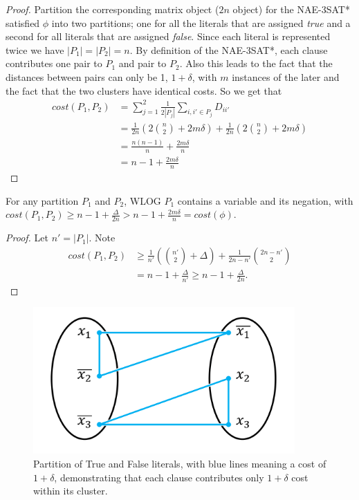 \begin{proof}
Partition the corresponding matrix object ($2n$ object) for the
NAE-3SAT* satisfied $\phi$ into two partitions; one for all the
literals that are assigned \textit{true} and a second for all literals
that are assigned \textit{false}.  Since each literal is represented
twice we have $|P_1| = |P_2| = n$.   By definition of the NAE-3SAT*,
each clause contributes one pair to $P_1$ and pair to $P_2$.   Also
this leads to the fact that the distances between pairs can only be 1,
$1+\delta$, with $m$ instances of the later and the fact that the two
clusters have identical costs. So we get that 
\begin{align*}
cost(P_1,P_2) &= \sum_{j=1}^{2} \frac{1}{2|P_j|} \sum_{i,i' \in P_j}
D_{ii'}\\ 
&= \frac{1}{2n}( 2 {n \choose 2} + 2m\delta ) + \frac{1}{2n}( 2 {n
  \choose 2} + 2m\delta ) \\ 
&= \frac{ n (n-1) } {n} + \frac{2 m \delta}{n} \\
&= n - 1 +  \frac{2 m \delta}{n}
\end{align*}
\end{proof}

\begin{lemma} \label{different-partitions}
For any partition $P_1$ and $P_2$, WLOG $P_1$ contains a variable and
its negation, with $cost(P_1,P_2) \ge n - 1 + \frac{\Delta}{2n} > n -
1 + \frac{2m\delta}{n} = cost(\phi).$ 
\end{lemma}

\begin{proof}
Let $n' = |P_1|$.  Note
\begin{align*}
cost(P_1,P_2) &\ge \frac{1}{n'}({n' \choose 2} + \Delta ) +
\frac{1}{2n-n'}{2n-n' \choose 2}  \\ 
&= n - 1 + \frac{\Delta}{n'} \ge n-1 +\frac{\Delta}{2n}.
\end{align*}
\end{proof}

\begin{figure}
    \centering
    \includegraphics[width=10cm]{chapter_1/files/KmeansNAE3SAT.png}
\centering
    \caption{Partition of True and False literals, with blue lines meaning a cost of $1+\delta$, demonstrating that each clause contributes only $1+\delta$ cost within its cluster.}
    \label{fig:my_label}
\end{figure}


